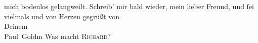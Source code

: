 \begin{ledgroupsized}[t]{13cm}
               mich bodenlos gelangweilt.\pend
           \pstart
           Schreib’ mir bald wieder, {\pb}mein lieber Freund, und
               ſei vielmals und von Herzen gegrüßt von {\\}Deinem {\\}\spacefill\mbox{Paul Goldm}\pend
           \pstart
           \noindent{}Was macht \textsc{Richard}?\pend
           
         
         \endnumbering{}\end{ledgroupsized}  \newcommand{\dateiname}{L03204}\newcommand{\titel}{Paul Goldmann an Arthur Schnitzler, 17. 4. [1902]}\newcommand{\editorInnen}{Martin Anton Müller und Laura Untner}
      